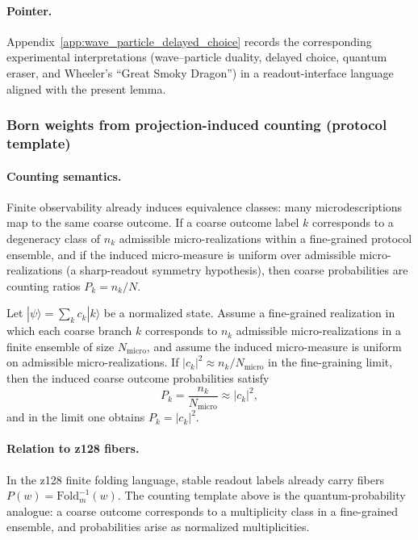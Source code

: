\paragraph{Pointer.}
Appendix~\ref{app:wave_particle_delayed_choice} records the corresponding experimental interpretations (wave--particle duality, delayed choice, quantum eraser, and Wheeler's ``Great Smoky Dragon'') in a readout-interface language aligned with the present lemma.

\subsubsection{Born weights from projection-induced counting (protocol template)}
\label{subsec:z128_born_counting_template}

\paragraph{Counting semantics.}
\InterfaceTag Finite observability already induces equivalence classes: many microdescriptions map to the same coarse outcome.
If a coarse outcome label $k$ corresponds to a degeneracy class of $n_k$ admissible micro-realizations within a fine-grained protocol ensemble, and if the induced micro-measure is uniform over admissible micro-realizations (a sharp-readout symmetry hypothesis), then coarse probabilities are counting ratios $P_k=n_k/N$.

\begin{theorem}
\label{thm:z128_born_counting_template}
Let $|\psi\rangle=\sum_k c_k|k\rangle$ be a normalized state.
Assume a fine-grained realization in which each coarse branch $k$ corresponds to $n_k$ admissible micro-realizations in a finite ensemble of size $N_{\mathrm{micro}}$, and assume the induced micro-measure is uniform on admissible micro-realizations.
If $|c_k|^2\approx n_k/N_{\mathrm{micro}}$ in the fine-graining limit, then the induced coarse outcome probabilities satisfy
\[
P_k=\frac{n_k}{N_{\mathrm{micro}}}\approx |c_k|^2,
\]
and in the limit one obtains $P_k=|c_k|^2$.
\end{theorem}

\paragraph{Relation to z128 fibers.}
\InterfaceTag In the z128 finite folding language, stable readout labels already carry fibers $P(w)=\mathrm{Fold}_m^{-1}(w)$.
The counting template above is the quantum-probability analogue: a coarse outcome corresponds to a multiplicity class in a fine-grained ensemble, and probabilities arise as normalized multiplicities.

